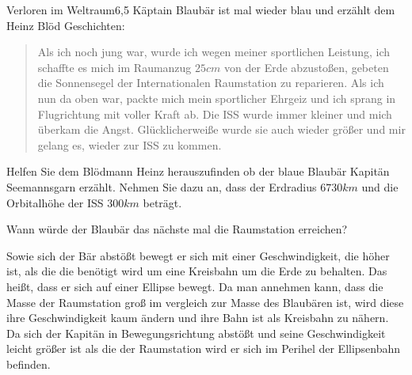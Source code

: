\begin{problem}{Verloren im Weltraum}{6,5}
Käptain Blaubär ist mal wieder blau und erzählt dem Heinz Blöd Geschichten:
\begin{quote}
 Als ich noch jung war, wurde ich wegen meiner sportlichen Leistung, ich schaffte es mich im Raumanzug $25\unit{cm}$ von der Erde abzustoßen, gebeten die Sonnensegel der Internationalen Raumstation zu reparieren. Als ich nun da oben war, packte mich mein sportlicher Ehrgeiz und ich sprang in Flugrichtung mit voller Kraft ab. Die ISS wurde immer kleiner und mich überkam die Angst. Glücklicherweiße wurde sie auch wieder größer und mir gelang es, wieder zur ISS zu kommen.
\end{quote}
\begin{abcenum}
 \item Helfen Sie dem Blödmann Heinz herauszufinden ob der blaue Blaubär Kapitän Seemannsgarn erzählt. Nehmen Sie dazu an, dass der Erdradius $6730\unit{km}$ und die Orbitalhöhe der ISS $300\unit{km}$ beträgt.
 \item Wann würde der Blaubär das nächste mal die Raumstation erreichen?
\end{abcenum}
\begin{solution}
Sowie sich der Bär abstößt bewegt er sich mit einer Geschwindigkeit, die höher ist, als die die benötigt wird um eine Kreisbahn um die Erde zu behalten. Das heißt, dass er sich auf einer Ellipse bewegt. Da man annehmen kann, dass die Masse der Raumstation groß im vergleich zur Masse des Blaubären ist, wird diese ihre Geschwindigkeit kaum ändern und ihre Bahn ist als Kreisbahn zu nähern. Da sich der Kapitän in Bewegungsrichtung abstößt und seine Geschwindigkeit leicht größer ist als die der Raumstation wird er sich im Perihel der Ellipsenbahn befinden.


\end{solution}
\end{problem}
